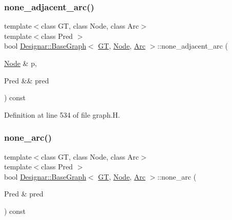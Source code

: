 \subsubsection{\texorpdfstring{none\+\_\+adjacent\+\_\+arc()}{none\_adjacent\_arc()}\hspace{0.1cm}{\footnotesize\ttfamily [2/2]}}
{\footnotesize\ttfamily template$<$class GT, class Node, class Arc$>$ \\
template$<$class Pred $>$ \\
bool \hyperlink{class_designar_1_1_base_graph}{Designar\+::\+Base\+Graph}$<$ \hyperlink{demo-buildgraph_8_c_a3001c40d2c31ca87ed96cd7d1334a55e}{GT}, \hyperlink{namespace_designar_a5af326c65aa2bd26b26c410f2030d09e}{Node}, \hyperlink{namespace_designar_a3f55fb5513d62ff47cbc8f72b8e95d6f}{Arc} $>$\+::none\+\_\+adjacent\+\_\+arc (\begin{DoxyParamCaption}\item[{\hyperlink{namespace_designar_a5af326c65aa2bd26b26c410f2030d09e}{Node} \&}]{p,  }\item[{Pred \&\&}]{pred }\end{DoxyParamCaption}) const\hspace{0.3cm}{\ttfamily [inline]}}



Definition at line 534 of file graph.\+H.

\mbox{\label{class_designar_1_1_base_graph_a023f28dd8824ba7a0c26342effd0fddf}} 
\subsubsection{\texorpdfstring{none\+\_\+arc()}{none\_arc()}\hspace{0.1cm}{\footnotesize\ttfamily [1/2]}}
{\footnotesize\ttfamily template$<$class GT, class Node, class Arc$>$ \\
template$<$class Pred $>$ \\
bool \hyperlink{class_designar_1_1_base_graph}{Designar\+::\+Base\+Graph}$<$ \hyperlink{demo-buildgraph_8_c_a3001c40d2c31ca87ed96cd7d1334a55e}{GT}, \hyperlink{namespace_designar_a5af326c65aa2bd26b26c410f2030d09e}{Node}, \hyperlink{namespace_designar_a3f55fb5513d62ff47cbc8f72b8e95d6f}{Arc} $>$\+::none\+\_\+arc (\begin{DoxyParamCaption}\item[{Pred \&}]{pred }\end{DoxyParamCaption}) const\hspace{0.3cm}{\ttfamily [inline]}}



